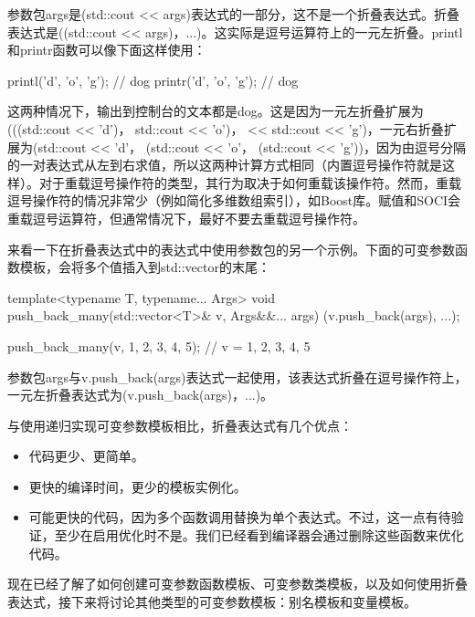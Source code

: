 参数包args是(std::cout <{}< args)表达式的一部分，这不是一个折叠表达式。折叠表达式是((std::cout <{}< args)，...)。这实际是逗号运算符上的一元左折叠。printl和printr函数可以像下面这样使用：

\begin{cpp}
printl('d', 'o', 'g'); // dog
printr('d', 'o', 'g'); // dog
\end{cpp}

这两种情况下，输出到控制台的文本都是dog。这是因为一元左折叠扩展为(((std::cout <{}< 'd')， std::cout <{}< 'o')， << std::cout <{}< 'g')，一元右折叠扩展为(std::cout <{}< 'd'， (std::cout <{}< 'o'， (std::cout <{}< 'g'))，因为由逗号分隔的一对表达式从左到右求值，所以这两种计算方式相同（内置逗号操作符就是这样）。对于重载逗号操作符的类型，其行为取决于如何重载该操作符。然而，重载逗号操作符的情况非常少（例如简化多维数组索引），如Boost库。赋值和SOCI会重载逗号运算符，但通常情况下，最好不要去重载逗号操作符。

来看一下在折叠表达式中的表达式中使用参数包的另一个示例。下面的可变参数函数模板，会将多个值插入到std::vector的末尾：

\begin{cpp}
template<typename T, typename... Args>
void push_back_many(std::vector<T>& v, Args&&... args)
{
	(v.push_back(args), ...);
}

push_back_many(v, 1, 2, 3, 4, 5); // v = {1, 2, 3, 4, 5}
\end{cpp}

参数包args与v.push\_back(args)表达式一起使用，该表达式折叠在逗号操作符上，一元左折叠表达式为(v.push\_back(args)，...)。

与使用递归实现可变参数模板相比，折叠表达式有几个优点：

\begin{itemize}
  \item 代码更少、更简单。

  \item 更快的编译时间，更少的模板实例化。

  \item 可能更快的代码，因为多个函数调用替换为单个表达式。不过，这一点有待验证，至少在启用优化时不是。我们已经看到编译器会通过删除这些函数来优化代码。
\end{itemize}

现在已经了解了如何创建可变参数函数模板、可变参数类模板，以及如何使用折叠表达式，接下来将讨论其他类型的可变参数模板：别名模板和变量模板。





















